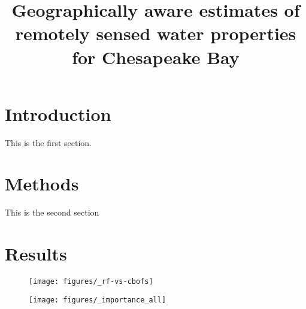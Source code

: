 \documentclass{article}
\title{Geographically aware estimates of remotely sensed water properties for Chesapeake Bay}
\author{}
\date{}
\begin{document}
\maketitle
\section{Introduction}

This is the first section.
\lipsum

\section{Methods}
This is the second section

\section{Results}

\begin{figure}[h!]
    \begin{center}
          \texttt{[image: figures/\_rf-vs-cbofs]}
    \end{center}    
\end{figure}

\begin{figure}[h!]
    \begin{center}
          \texttt{[image: figures/\_importance\_all]}
    \end{center}    
\end{figure}
\end{document}
